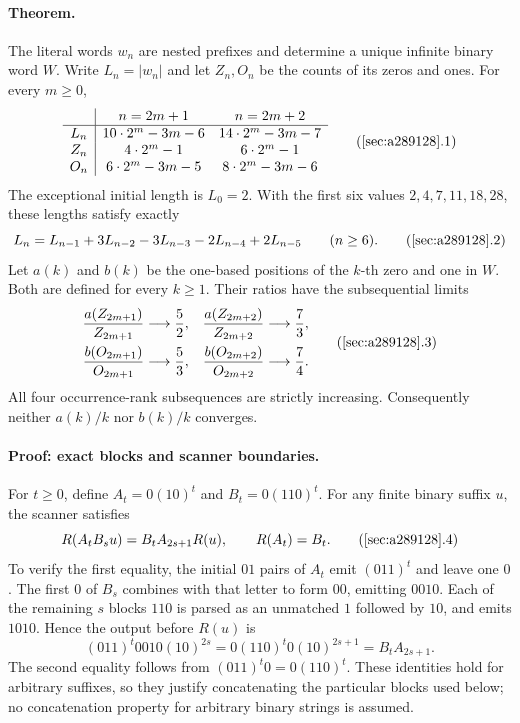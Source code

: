 \documentclass[11pt]{article}
\begin{document}
\paragraph{Theorem.}
The literal words $w_n$ are nested prefixes and determine a unique
infinite binary word $W$. Write $L_n=|w_n|$ and let $Z_n,O_n$ be the
counts of its zeros and ones. For every $m\ge0$,
\[
\begin{array}{c|cc}
 & n=2m+1 & n=2m+2\\ \hline
L_n & 10\cdot2^m-3m-6 & 14\cdot2^m-3m-7\\
Z_n & 4\cdot2^m-1 & 6\cdot2^m-1\\
O_n & 6\cdot2^m-3m-5 & 8\cdot2^m-3m-6
\end{array}
\tag{\ref{sec:a289128}.1}
\]
The exceptional initial length is $L_0=2$. With the first six values
$2,4,7,11,18,28$, these lengths satisfy exactly
\[
L_n=L_{n-1}+3L_{n-2}-3L_{n-3}-2L_{n-4}+2L_{n-5}
\qquad(n\ge6).
\tag{\ref{sec:a289128}.2}
\]
Let $a(k)$ and $b(k)$ be the one-based positions of the $k$-th zero
and one in $W$. Both are defined for every $k\ge1$. Their ratios have
the subsequential limits
\[
\begin{aligned}
\frac{a(Z_{2m+1})}{Z_{2m+1}}&\longrightarrow\frac52,
&\frac{a(Z_{2m+2})}{Z_{2m+2}}&\longrightarrow\frac73,\\
\frac{b(O_{2m+1})}{O_{2m+1}}&\longrightarrow\frac53,
&\frac{b(O_{2m+2})}{O_{2m+2}}&\longrightarrow\frac74.
\end{aligned}
\tag{\ref{sec:a289128}.3}
\]
All four occurrence-rank subsequences are strictly increasing.
Consequently neither $a(k)/k$ nor $b(k)/k$ converges.

\paragraph{Proof: exact blocks and scanner boundaries.}
For $t\ge0$, define $A_t=0(10)^t$ and $B_t=0(110)^t$. For any finite
binary suffix $u$, the scanner satisfies
\[
R(A_tB_su)=B_tA_{2s+1}R(u),\qquad R(A_t)=B_t.
\tag{\ref{sec:a289128}.4}
\]
To verify the first equality, the initial $01$ pairs of $A_t$ emit
$(011)^t$ and leave one $0$. The first $0$ of $B_s$ combines with
that letter to form $00$, emitting $0010$. Each of the remaining
$s$ blocks $110$ is parsed as an unmatched $1$ followed by $10$,
and emits $1010$. Hence the output before $R(u)$ is
\[
(011)^t0010(10)^{2s}=0(110)^t0(10)^{2s+1}=B_tA_{2s+1}.
\]
The second equality follows from
$(011)^t0=0(110)^t$. These identities hold for arbitrary suffixes,
so they justify concatenating the particular blocks used below;
no concatenation property for arbitrary binary strings is assumed.
\end{document}
